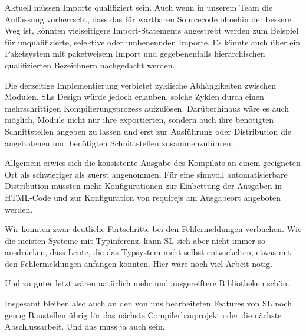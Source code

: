 \documentclass[runningheads]{llncs}
\begin{document}
Aktuell müssen Importe qualifiziert sein. Auch wenn in unserem Team die
Auffassung vorherrscht, dass das für wartbaren Sourcecode ohnehin der
bessere Weg ist, könnten vielseitigere Import-Statements angestrebt werden
zum Beispiel für unqualifizierte, selektive oder umbenennden Importe.
Es könnte auch über ein Paketsystem mit paketweisem Import und gegebenenfalls
hierarchischen qualifizierten Bezeichnern nachgedacht werden.

Die derzeitige Implementierung verbietet zyklische Abhängikeiten zwischen
Modulen. SLs Design würde jedoch erlauben, solche Zyklen durch einen
mehrschrittigen Kompilierungsprozess aufzulösen. Darüberhinaus wäre es auch
möglich, Module nicht nur ihre exportierten, sondern auch ihre benötigten
Schnittstellen angeben zu lassen und erst zur Ausführung oder Distribution
die angebotenen und benötigten Schnittstellen zusammenzuführen.

Allgemein erwies sich die konsistente Ausgabe des Kompilats an einem
geeigneten Ort als schwieriger als zuerst angenommen. Für eine sinnvoll
automatisierbare Distribution müssten mehr Konfigurationen zur Einbettung
der Ausgaben in HTML-Code und zur Konfiguration von requirejs am Ausgabeort
angeboten werden.

Wir konnten zwar deutliche Fortschritte bei den Fehlermeldungen verbuchen.
Wie die meisten Systeme mit Typinferenz, kann SL sich aber nicht immer so
ausdrücken, dass Leute, die das Typsystem nicht selbst entwickelten,
etwas mit den Fehlermeldungen anfangen könnten. Hier wäre noch viel Arbeit
nötig.

Und zu guter letzt wären natürlich mehr und ausgereiftere Bibliotheken
schön.

Insgesamt bleiben also auch an den von uns bearbeiteten Features von SL
noch genug Baustellen übrig für das nächste Compilerbauprojekt oder die
nächste Abschlussarbeit. Und das muss ja auch sein.
\end{document}
